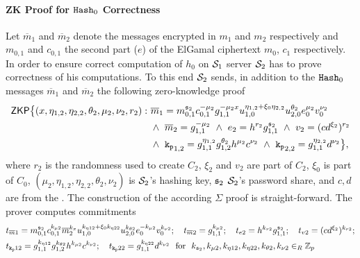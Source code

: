\paragraph{ZK Proof for $\mathtt{Hash}_0$ Correctness}
Let $\overline{m}_1$ and $\overline{m}_2$ denote the messages encrypted in $m_1$ and $m_2$ respectively and $m_{0,1}$ and $c_{0,1}$ the second part ($e$) of the ElGamal ciphertext $m_0$, $c_1$ respectively.
In order to ensure correct computation of $h_0$ on $\mathcal{S}_1$ server $\mathcal{S}_2$ has to prove correctness of his computations.
To this end $\mathcal{S}_2$ sends, in addition to the $\mathtt{Hash}_0$ messages $\overline{m}_1$ and $\overline{m}_2$ the following zero-knowledge proof 
\begin{equation}
\begin{split}
    \mathsf{ZKP}\big\{ (x, \eta_{1,2}, \eta_{2,2}, \theta_2, \mu_2, \nu_2, r_2): ~ &  
      \overline{m}_1 = m_{0,1}^{\mathfrak{s}_2} c_{0,1}^{-\mu_2} g_{1,1}^{-\mu_2 x} u_{1,0}^{\eta_{1,2} + \xi_0 \eta_{2,2}} u_{2,0}^{\theta_2} e_0^{\mu_2} v_0^{\nu_2} \\
      & \wedge ~ \overline{m}_2 = g_{1,1}^{-\mu_2} ~ \wedge ~ e_2 = h^{r_2}g_{1,1}^{\mathfrak{s}_2} ~ \wedge ~ v_2 = (cd^{\xi_2})^{r_2} \\
      & \wedge ~ \mathtt{k_p}_{1,2} = g_{1,1}^{\eta_{1,2}} g_{1,2}^{\theta_2} h^{\mu_2} c^{\nu_2} ~ \wedge ~ \mathtt{k_p}_{2,2} = g_{1,1}^{\eta_{2,2}} d^{\nu_2}
      \big\},
\end{split}
\end{equation}
where $r_2$ is the randomness used to create $C_2$, $\xi_2$ and $v_2$ are part of $C_2$, $\xi_0$ is part of $C_0$, $(\mu_2, \eta_{1,2}, \eta_{2,2}, \theta_2, \nu_2)$ is $\mathcal{S}_2$'s hashing key, $\mathfrak{s}_2$ $\mathcal{S}_2$'s password share, and $c,d$ are from the \crs.
The construction of the according $\Sigma$ proof is straight-forward.
The prover computes commitments
\begin{align*}
  & t_{\overline{m}1} = m_{0,1}^{{\mathfrak{s}_2}} c_{0,1}^{k_{\mu2}} \overline{m}_{2}^{k_{x}} u_{1,0}^{k_{\eta12} + \xi_0 k_{\eta22}} u_{2,0}^{k_{\theta2}} e_0^{-k_{\mu2}} v_0^{k_{\nu2}}; ~~~
    t_{\overline{m}2} = g_{1,1}^{k_{\mu2}}; ~~~  t_{e2} = h^{k_{r2}}g_{1,1}^{{\mathfrak{s}_2}}; ~~~ t_{v2} = (cd^{\xi_2})^{k_{r2}}; \\
  & t_{\mathtt{k_p}12} = g_{1,1}^{k_{\eta12}} g_{1,2}^{k_{\theta2}} h^{k_{\mu2}} c^{k_{\nu2}}; ~~~ t_{\mathtt{k_p}22} = g_{1,1}^{k_{\eta22}} d^{k_{\nu2}}
    \text{ ~for~ } k_{\mathfrak{s}_2}, k_{\mu2}, k_{\eta12}, k_{\eta22}, k_{\theta2}, k_{\nu2} \in_R \mathbb{Z}_p
\end{align*}
